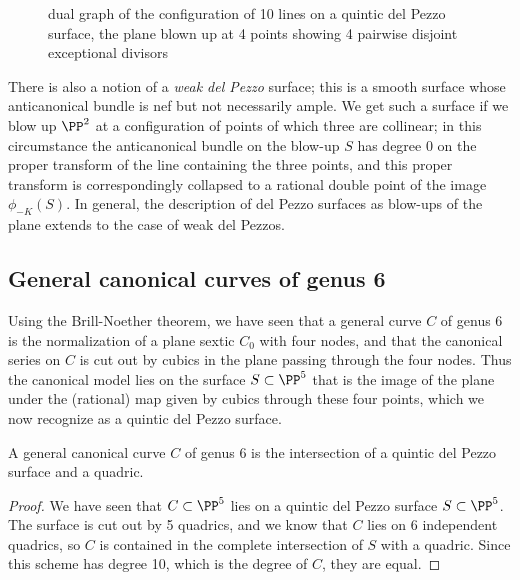 \begin{fact}
\begin{figure}
\begin{center}
\caption{dual graph of the configuration of 10 lines on a quintic del Pezzo surface, the plane blown up
at 4 points showing 4 pairwise disjoint exceptional divisors}
\label{dual graph of the configuration of 10 lines on a quintic del Pezzo surface}
\end{center}
\end{figure}

There is also a notion of a \emph{weak del Pezzo} surface; this is a smooth surface whose anticanonical bundle is nef but not necessarily ample. We get such a surface if we blow up $\PP^2$ at a configuration of points of which three are collinear; in this circumstance the anticanonical bundle on the blow-up $S$ has degree 0 on the proper transform of the line containing the three points, and this proper transform is correspondingly collapsed to a rational double point of the image $\phi_{-K}(S)$. In general, the description of del Pezzo surfaces as blow-ups of the plane extends to the case of weak del Pezzos.
\end{fact}


\subsection{General canonical curves of genus 6}

Using the Brill-Noether theorem, we have seen that a general curve $C$ of genus 6 is the normalization of a plane sextic $C_0$ with four nodes, and that the canonical series on $C$ is cut out by cubics in the plane passing through the four nodes. Thus the canonical model lies on the surface $S \subset \PP^5$ that is the image of the plane under the (rational) map given by cubics through these four points, which we now recognize as a quintic del Pezzo surface.

\begin{theorem}
A general canonical curve $C$ of genus 6 is the intersection of a quintic del Pezzo surface and a quadric. 
\end{theorem}

\begin{proof}
We have seen that $C \subset \PP^5$ lies on a quintic del Pezzo surface $S \subset \PP^5$. The surface is cut out by 5 quadrics, and we know that $C$ lies on 6 independent quadrics,
so $C$ is contained in the complete intersection of $S$ with a quadric. Since this scheme has degree 10, which is the degree of $C$, they are equal.
\end{proof}


